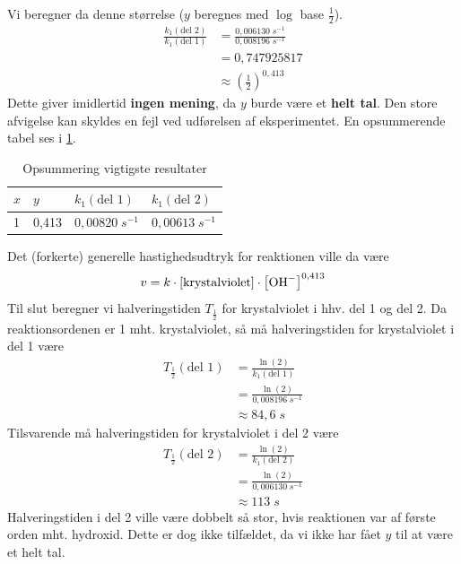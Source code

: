 \documentclass{report}
\begin{document}
Vi beregner da denne størrelse ($y$ beregnes med $\log$ base $\frac{1}{2}$).
\begin{equation*}
\begin{split}
  \frac{k_1(\text{del 2} )}{k_1(\text{del 1} )}&=\frac{0,006130 \;\unit{s ^{-1}} }{0,008196 \;\unit{s ^{-1}} }\\
  &=0,747925817\\
  &\approx \left(\frac{1}{2}\right) ^{0,413}
\end{split}
\end{equation*}
Dette giver imidlertid \textbf{ingen mening}, da $y$ burde være et \textbf{helt tal}.
Den store afvigelse kan skyldes en fejl ved udførelsen af eksperimentet.
En opsummerende tabel ses i \cref{tab:opsum}.
\begin{table}[H]
  \centering
  \begin{tabular}{@{}llll@{}}
  \toprule
  $x$ & $y$ & $k_1(\text{del 1} )$ & $k_1(\text{del 2} )$ \\
  \midrule 
  1 & 0,413 & $0,00820 \;\unit{s ^{-1}} $ & $0,00613 \;\unit{s ^{-1}} $\\ 
  \bottomrule
  \end{tabular}
  \caption{Opsummering vigtigste resultater}
  \label{tab:opsum}
\end{table}
Det (forkerte) generelle hastighedsudtryk for reaktionen ville da være
\[
v= k \cdot \left[\text{krystalviolet} \right]\cdot \left[\ce{OH-} \right] ^{0,413}
\] 
Til slut beregner vi halveringstiden $T _{\frac{1}{2}}$ for krystalviolet i hhv. del 1 og del 2.
Da reaktionsordenen er 1 mht. krystalviolet, så må halveringstiden for krystalviolet i del 1 være
\begin{equation*}
\begin{split}
  T _{\frac{1}{2}}(\text{del 1} )&=\frac{\ln\left(2\right) }{k_1(\text{del 1} )}\\
  &=\frac{\ln\left(2\right) }{0,008196 \;\unit{s ^{-1}} }\\
  &\approx 84,6 \;\unit{s} 
\end{split}
\end{equation*}
Tilsvarende må halveringstiden for krystalviolet i del 2 være
\begin{equation*}
\begin{split}
T _{\frac{1}{2}}(\text{del 2} )&=\frac{\ln\left(2\right) }{k_1(\text{del 2} )}\\
  &=\frac{\ln\left(2\right) }{0,006130 \;\unit{s ^{-1}} }\\
  &\approx 113 \;\unit{s} 
\end{split}
\end{equation*}
Halveringstiden i del 2 ville være dobbelt så stor, hvis reaktionen var af første orden mht. hydroxid.
Dette er dog ikke tilfældet, da vi ikke har fået $y$ til at være et helt tal. 
\end{document}
